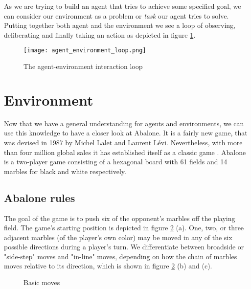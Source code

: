 As we are trying to build an agent that tries to achieve some specified goal, we can consider our environment as a problem or \textit{task} our agent tries to solve. Putting together both agent and the environment we see a loop of observing,  deliberating and finally taking an action as depicted in figure \ref{agent_environment_loop}.

\begin{figure}
    \centering
    \texttt{[image: agent\_environment\_loop.png]}
    \caption{The agent-environment interaction loop}
    \label{agent_environment_loop}
\end{figure}

\section{Environment}
Now that we have a general understanding for agents and environments, we can use this knowledge to have a closer look at Abalone. It is a fairly new game, that was devised in 1987 by Michel Lalet and Laurent Lévi. Nevertheless, with more than four million global sales it has established itself as a classic game \cite{noauthor_abalone_2020}. Abalone is a two-player game consisting of a hexagonal board with 61 fields and 14 marbles for black and white respectively.

\subsection{Abalone rules}
The goal of the game is to push six of the opponent's marbles off the playing field. The game's starting position is depicted in figure \ref{basics} (a). One, two, or three adjacent marbles (of the player's own color) may be moved in any of the six possible directions during a player's turn. We differentiate between broadside or "side-step" moves and "in-line" moves, depending on how the chain of marbles moves relative to its direction, which is shown in figure \ref{basics} (b) and (c).

\begin{figure}[!h]
    \centering
    \hfill
    \hfill
    \caption{Basic moves \cite{abalone_sa_abalone_nodate}}
    \label{basics}
\end{figure}


